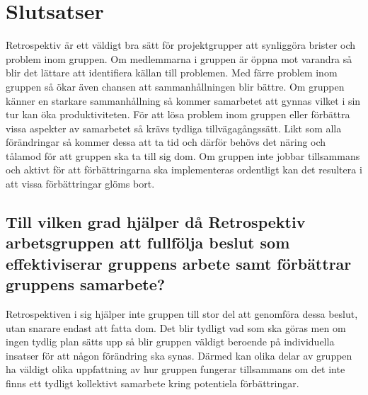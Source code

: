 




\section{Slutsatser}
\label{cha:johan_n-conclusion}
Retrospektiv är ett väldigt bra sätt för projektgrupper att synliggöra brister och problem inom gruppen. Om medlemmarna i gruppen är öppna mot varandra så blir det lättare att identifiera källan till problemen. Med färre problem inom gruppen så ökar även chansen att sammanhållningen blir bättre. Om gruppen känner en starkare sammanhållning så kommer samarbetet att gynnas vilket i sin tur kan öka produktiviteten. För att lösa problem inom gruppen eller förbättra vissa aspekter av samarbetet så krävs tydliga tillvägagångssätt. Likt som alla förändringar så kommer dessa att ta tid och därför behövs det näring och tålamod för att gruppen ska ta till sig dom. Om gruppen inte jobbar tillsammans och aktivt för att förbättringarna ska implementeras ordentligt kan det resultera i att vissa förbättringar glöms bort. \\
\subsection{Till vilken grad hjälper då Retrospektiv arbetsgruppen att fullfölja beslut som effektiviserar gruppens arbete samt förbättrar gruppens samarbete?}
Retrospektiven i sig hjälper inte gruppen till stor del att genomföra dessa beslut, utan snarare endast att fatta dom. Det blir tydligt vad som ska göras men om ingen tydlig plan sätts upp så blir gruppen väldigt beroende på individuella insatser för att någon förändring ska synas. Därmed kan olika delar av gruppen ha väldigt olika uppfattning av hur gruppen fungerar tillsammans om det inte finns ett tydligt kollektivt samarbete kring potentiela förbättringar.


